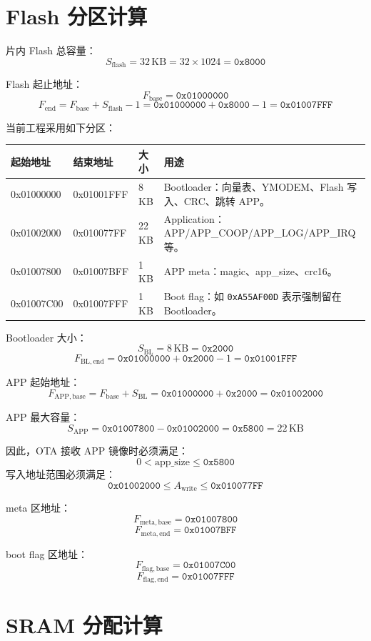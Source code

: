 \documentclass[UTF8,a4paper,11pt]{ctexart}
\newcommand{\hex}[1]{\texttt{#1}}
\newcommand{\addr}[1]{\texttt{#1}}
\begin{document}
\section{Flash 分区计算}

片内 Flash 总容量：
\[
  S_{\mathrm{flash}} = 32\,\mathrm{KB} = 32 \times 1024 = \addr{0x8000}
\]

Flash 起止地址：
\[
  F_{\mathrm{base}} = \addr{0x01000000}
\]
\[
  F_{\mathrm{end}}
  = F_{\mathrm{base}} + S_{\mathrm{flash}} - 1
  = \addr{0x01000000} + \addr{0x8000} - 1
  = \addr{0x01007FFF}
\]

当前工程采用如下分区：

\begin{longtable}{>{\ttfamily}p{3.3cm}>{\ttfamily}p{3.3cm}p{2.3cm}p{5.4cm}}
\toprule
起始地址 & 结束地址 & 大小 & 用途 \\
\midrule
\endhead
0x01000000 & 0x01001FFF & 8 KB & Bootloader：向量表、YMODEM、Flash 写入、CRC、跳转 APP。\\
0x01002000 & 0x010077FF & 22 KB & Application：APP/APP\_COOP/APP\_LOG/APP\_IRQ 等。\\
0x01007800 & 0x01007BFF & 1 KB & APP meta：magic、app\_size、crc16。\\
0x01007C00 & 0x01007FFF & 1 KB & Boot flag：如 \hex{0xA55AF00D} 表示强制留在 Bootloader。\\
\bottomrule
\end{longtable}

Bootloader 大小：
\[
  S_{\mathrm{BL}} = 8\,\mathrm{KB} = \addr{0x2000}
\]
\[
  F_{\mathrm{BL,end}}
  = \addr{0x01000000} + \addr{0x2000} - 1
  = \addr{0x01001FFF}
\]

APP 起始地址：
\[
  F_{\mathrm{APP,base}}
  = F_{\mathrm{base}} + S_{\mathrm{BL}}
  = \addr{0x01000000} + \addr{0x2000}
  = \addr{0x01002000}
\]

APP 最大容量：
\[
  S_{\mathrm{APP}}
  = \addr{0x01007800} - \addr{0x01002000}
  = \addr{0x5800}
  = 22\,\mathrm{KB}
\]

因此，OTA 接收 APP 镜像时必须满足：
\[
  0 < \mathrm{app\_size} \leq \addr{0x5800}
\]
写入地址范围必须满足：
\[
  \addr{0x01002000}
  \leq A_{\mathrm{write}}
  \leq
  \addr{0x010077FF}
\]

meta 区地址：
\[
  F_{\mathrm{meta,base}} = \addr{0x01007800}
\]
\[
  F_{\mathrm{meta,end}} = \addr{0x01007BFF}
\]

boot flag 区地址：
\[
  F_{\mathrm{flag,base}} = \addr{0x01007C00}
\]
\[
  F_{\mathrm{flag,end}} = \addr{0x01007FFF}
\]

\section{SRAM 分配计算}
\end{document}
